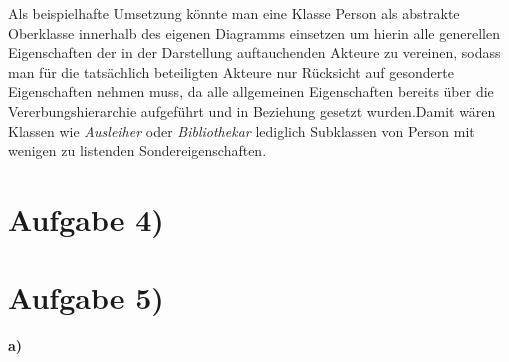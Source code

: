 \documentclass{swp1}
\begin{document}
Als beispielhafte Umsetzung könnte man eine Klasse Person als abstrakte Oberklasse innerhalb des eigenen Diagramms einsetzen um hierin alle generellen Eigenschaften der in der Darstellung auftauchenden Akteure zu vereinen, sodass man für die tatsächlich beteiligten Akteure nur Rücksicht auf gesonderte Eigenschaften nehmen muss, da alle allgemeinen Eigenschaften bereits über die Vererbungshierarchie aufgeführt und in Beziehung gesetzt wurden.Damit wären Klassen wie \emph{Ausleiher} oder \emph{Bibliothekar} lediglich Subklassen von Person mit wenigen zu listenden Sondereigenschaften.

\section*{Aufgabe 4)}



\section*{Aufgabe 5)}

\textbf{a)}\newline
\end{document}
